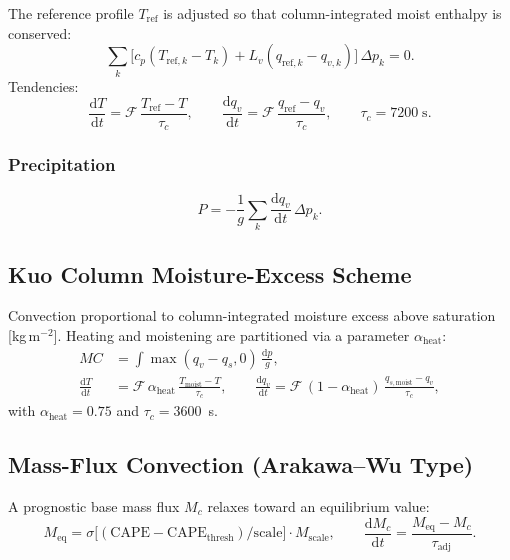 \documentclass[11pt,twoside]{report}
\newcommand{\dd}{\mathrm{d}}
\newcommand{\cpd}{c_p}
\newcommand{\Lv}{L_v}
\begin{document}
The reference profile $T_{\mathrm{ref}}$ is adjusted so that column-integrated
moist enthalpy is conserved:
\begin{equation}
  \sum_k\bigl[\cpd(T_{\mathrm{ref},k}-T_k)
  +\Lv(q_{\mathrm{ref},k}-q_{v,k})\bigr]\,\Delta p_k = 0.
\end{equation}
Tendencies:
\begin{equation}
  \frac{\dd T}{\dd t} = \mathcal{F}\,\frac{T_{\mathrm{ref}}-T}{\tau_c},
  \qquad
  \frac{\dd q_v}{\dd t} = \mathcal{F}\,\frac{q_{\mathrm{ref}}-q_v}{\tau_c},
  \qquad \tau_c=7200\;\text{s}.
\end{equation}

\subsubsection{Precipitation}
\begin{equation}
  P = -\frac{1}{g}\sum_k \frac{\dd q_v}{\dd t}\,\Delta p_k.
\end{equation}

\subsection{Kuo Column Moisture-Excess Scheme}

Convection proportional to column-integrated moisture excess above
saturation [kg\,m$^{-2}$].  Heating and moistening are partitioned
via a parameter $\alpha_{\mathrm{heat}}$:
\begin{align}
  MC &= \int \max(q_v - q_s, 0)\,\frac{\dd p}{g}, \\
  \frac{\dd T}{\dd t} &= \mathcal{F}\,\alpha_{\mathrm{heat}}\,
  \frac{T_{\mathrm{moist}}-T}{\tau_c}, \qquad
  \frac{\dd q_v}{\dd t} = \mathcal{F}\,(1-\alpha_{\mathrm{heat}})\,
  \frac{q_{s,\mathrm{moist}}-q_v}{\tau_c},
\end{align}
with $\alpha_{\mathrm{heat}}=0.75$ and $\tau_c=3600$~s.

\subsection{Mass-Flux Convection (Arakawa--Wu Type)}

A prognostic base mass flux $M_c$ relaxes toward an equilibrium value:
\begin{equation}
  M_{\mathrm{eq}} = \sigma\!\bigl[(\mathrm{CAPE}-\mathrm{CAPE}_{\mathrm{thresh}})
  /\mathrm{scale}\bigr]\cdot M_{\mathrm{scale}},
  \qquad
  \frac{\dd M_c}{\dd t} = \frac{M_{\mathrm{eq}}-M_c}{\tau_{\mathrm{adj}}}.
\end{equation}
\end{document}
